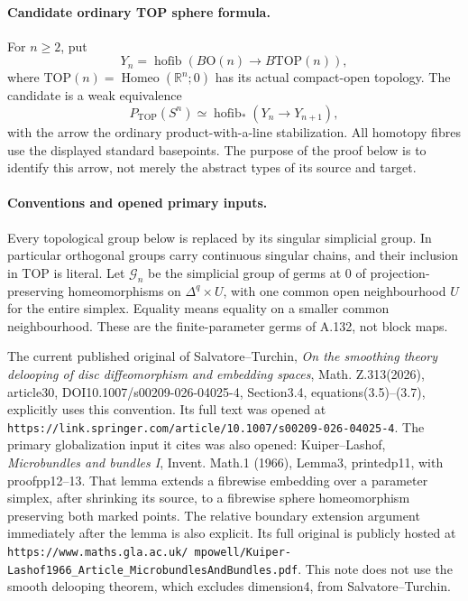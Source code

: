 \paragraph{Candidate ordinary TOP sphere formula.}
For $n\ge2$, put
\[
 Y_n=\operatorname{hofib}(B\mathrm O(n)\longrightarrow
                             B\mathrm{TOP}(n)),
\]
where $\mathrm{TOP}(n)=\operatorname{Homeo}(\mathbb R^n;0)$
has its actual compact-open topology. The candidate is a weak
equivalence
\[
 P_{\mathrm{TOP}}(S^n)
   \simeq\operatorname{hofib}_*(Y_n\longrightarrow Y_{n+1}),
                                                               \tag{S.1}
\]
with the arrow the ordinary product-with-a-line stabilization.
All homotopy fibres use the displayed standard basepoints. The
purpose of the proof below is to identify this arrow, not merely
the abstract types of its source and target.

\paragraph{Conventions and opened primary inputs.}
Every topological group below is replaced by its singular simplicial
group. In particular orthogonal groups carry continuous singular
chains, and their inclusion in TOP is literal. Let $\mathcal G_n$
be the simplicial group of germs at $0$ of projection-preserving
homeomorphisms on $\Delta^q\times U$, with one common open
neighbourhood $U$ for the entire simplex. Equality means equality
on a smaller common neighbourhood. These are the finite-parameter
germs of A.132, not block maps.

The current published original of Salvatore--Turchin,
\emph{On the smoothing theory delooping of disc diffeomorphism and
embedding spaces}, Math. Z.313(2026), article30,
DOI10.1007/s00209-026-04025-4, Section3.4, equations(3.5)--(3.7),
explicitly uses this convention. Its full text was opened at
\texttt{https://link.springer.com/article/10.1007/s00209-026-04025-4}.
The primary globalization input it cites was also opened:
Kuiper--Lashof, \emph{Microbundles and bundles I}, Invent. Math.1
(1966), Lemma3, printedp11, with proofpp12--13. That lemma extends
a fibrewise embedding over a parameter simplex, after shrinking its
source, to a fibrewise sphere homeomorphism preserving both marked
points. The relative boundary extension argument immediately after
the lemma is also explicit. Its full original is publicly hosted at
\texttt{https://www.maths.gla.ac.uk/\string~mpowell/Kuiper-Lashof1966\_Article\_MicrobundlesAndBundles.pdf}.
This note does not use the smooth delooping theorem, which excludes
dimension4, from Salvatore--Turchin.

